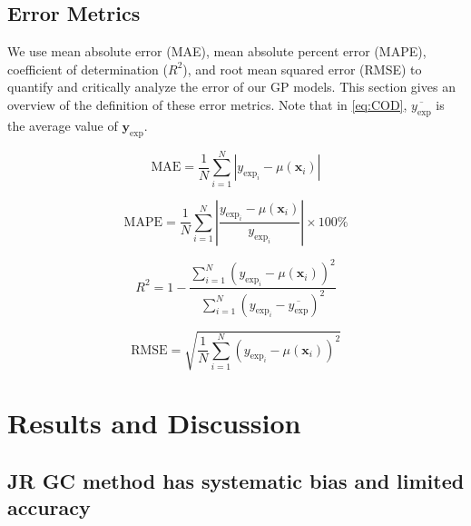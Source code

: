 \documentclass[journal=jacsat,manuscript=article]{achemso}
\newcommand{\alltodo}[1]{{\color{Cyan} (\texttt{alltodo}: #1)}}
\begin{document}
\subsection{Error Metrics}
We use mean absolute error (MAE), mean absolute percent error (MAPE), coefficient of determination ($R^2$), and root mean squared error (RMSE) to quantify and critically analyze the error of our GP models. This section gives an overview of the definition of these error metrics. Note that in \eqref{eq:COD}, $\overline{y_{\text{exp}}}$ is the average value of $\mathbf{y}_{\text{exp}}$. 

\begin{equation}
    \text{MAE} = \frac{1}{N} \sum_{i=1}^{N} \left| y_{\text{exp}_i} - \mu(\mathbf{x}_i) \right|
    \label{eq:MAE}
\end{equation}


\begin{equation}
    \text{MAPE} = \frac{1}{N} \sum_{i=1}^{N} \left| \frac{y_{\text{exp}_i} - \mu(\mathbf{x}_i)}{y_{\text{exp}_i}} \right| \times 100\%
    \label{eq:MAPD}
\end{equation}

\begin{equation}
    R^2 = 1 - \frac{\sum_{i=1}^{N} \left( y_{\text{exp}_i} - \mu(\mathbf{x}_i) \right)^2}{\sum_{i=1}^{N} \left( y_{\text{exp}_i} - \overline{y_{\text{exp}}} \right)^2}
    \label{eq:COD}
\end{equation}

\begin{equation}
    \text{RMSE} = \sqrt{\frac{1}{N} \sum_{i=1}^{N} \left( y_{\text{exp}_i} - \mu(\mathbf{x}_i) \right)^2}
    \label{eq:RMSE}
\end{equation}

\section{Results and Discussion}

\subsection{JR GC method has systematic bias and limited accuracy}
\end{document}
